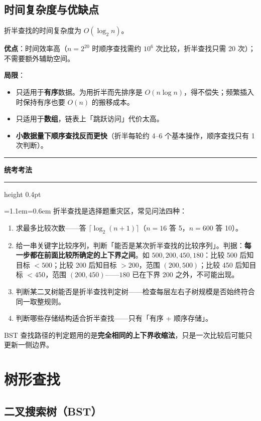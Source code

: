 \documentclass[11pt,openany,UTF8]{ctexbook}
\newcommand{\callouthead}[2]{%
  \par\addvspace{7pt}\noindent
  {\color{#1}\rule[-0.15em]{3pt}{1.05em}}\hspace{0.5em}%
  {\bfseries\color{#1}#2}\par\nobreak\vspace{-0.35em}%
  {\color{rulesep}\hrule height 0.4pt}\nobreak\vspace{0.45em}%
  \begingroup\small\setlength{\parindent}{0pt}%
  \leftskip=1.1em\rightskip=0.6em\noindent\ignorespaces}
\newcommand{\calloutend}{\par\endgroup\addvspace{7pt}}
\newenvironment{callexam}[1]{\callouthead{exambar}{#1}}{\calloutend}
\begin{document}
\subsection{时间复杂度与优缺点}

折半查找的时间复杂度为 $O(\log_2 n)$。

\textbf{优点}：时间效率高（$n=2^{20}$ 时顺序查找需约 $10^6$ 次比较，折半查找只需 20 次）；不需要额外辅助空间。

\textbf{局限}：

\begin{itemize}
\item 只适用于\textbf{有序}数据。为用折半而先排序是 $O(n\log n)$，得不偿失；频繁插入时保持有序也要 $O(n)$ 的搬移成本。
\item 只适用于\textbf{数组}，链表上「跳跃访问」代价太高。
\item \textbf{小数据量下顺序查找反而更快}（折半每轮约 4–6 个基本操作，顺序查找只有 1 次判断）。
\end{itemize}
\begin{callexam}{统考考法}
折半查找是选择题重灾区，常见问法四种：

\begin{enumerate}
\item 求最多比较次数——答 $\lceil\log_2(n+1)\rceil$（$n=16$ 答 5，$n=600$ 答 10）。
\item 给一串关键字比较序列，判断「能否是某次折半查找的比较序列」。判据：\textbf{每一步都在前面比较所确定的上下界之间}。如 $500,200,450,180$：比较 500 后知目标 $<500$；比较 200 后知目标 $>200$，范围 $(200,500)$；比较 450 后知目标 $<450$，范围 $(200,450)$——$180$ 已在下界 200 之外，不可能出现。
\item 判断某二叉树能否是折半查找判定树——检查每层左右子树规模是否始终符合同一取整规则。
\item 判断哪些存储结构适合折半查找——只有「有序 + 顺序存储」。
\end{enumerate}
BST 查找路径的判定题用的是\textbf{完全相同的上下界收缩法}，只是一次比较后可能只更新一侧边界。

\end{callexam}

\section{树形查找}

\subsection{二叉搜索树（BST）}
\end{document}
